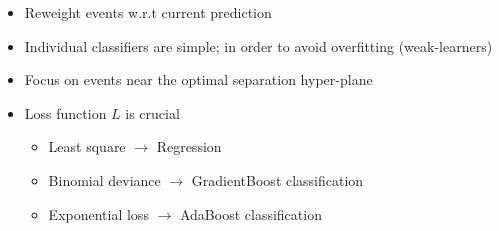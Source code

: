 \begin{frame}
\begin{center}
\begin{columns}
        \begin{itemize}
          \item Reweight events w.r.t current prediction
          \item Individual classifiers are simple; in order to avoid overfitting (weak-learners)
          \item Focus on events near the optimal separation hyper-plane
          \item Loss function $L$ is crucial
            \begin{itemize}
              \item Least square $\rightarrow$ Regression
              \item Binomial deviance $\rightarrow$ GradientBoost classification
              \item Exponential loss $\rightarrow$ AdaBoost classification
            \end{itemize}
        \end{itemize}
      \end{columns}

    \end{center}
\end{frame}


